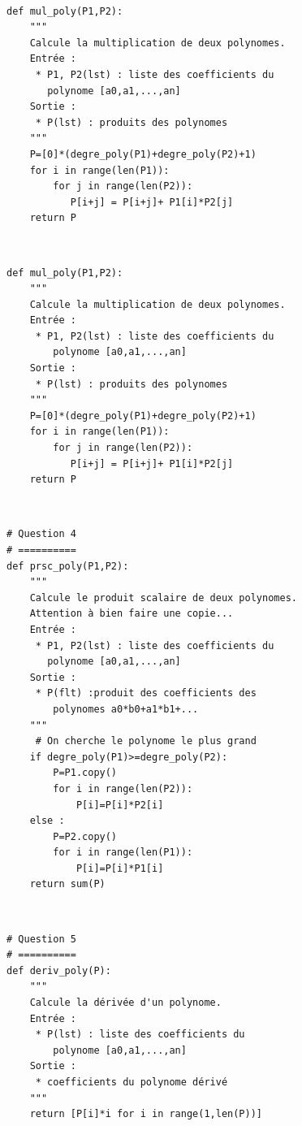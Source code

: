 \documentclass[10pt,fleqn]{article} %
\begin{document}
\begin{corrige}
$\quad$
\begin{lstlisting}
def mul_poly(P1,P2):
    """
    Calcule la multiplication de deux polynomes.
    Entrée : 
     * P1, P2(lst) : liste des coefficients du 
       polynome [a0,a1,...,an]
    Sortie : 
     * P(lst) : produits des polynomes
    """
    P=[0]*(degre_poly(P1)+degre_poly(P2)+1)
    for i in range(len(P1)):
        for j in range(len(P2)):
           P[i+j] = P[i+j]+ P1[i]*P2[j]
    return P
\end{lstlisting}
\end{corrige}

\begin{corrige}
$\quad$
\begin{lstlisting}
def mul_poly(P1,P2):
    """
    Calcule la multiplication de deux polynomes.
    Entrée : 
     * P1, P2(lst) : liste des coefficients du 
        polynome [a0,a1,...,an]
    Sortie : 
     * P(lst) : produits des polynomes
    """
    P=[0]*(degre_poly(P1)+degre_poly(P2)+1)
    for i in range(len(P1)):
        for j in range(len(P2)):
           P[i+j] = P[i+j]+ P1[i]*P2[j]
    return P
\end{lstlisting}
\end{corrige}



\begin{corrige}
$\quad$
\begin{lstlisting}
# Question 4
# ==========
def prsc_poly(P1,P2):
    """
    Calcule le produit scalaire de deux polynomes.
    Attention à bien faire une copie...
    Entrée : 
     * P1, P2(lst) : liste des coefficients du 
       polynome [a0,a1,...,an]
    Sortie : 
     * P(flt) :produit des coefficients des 
        polynomes a0*b0+a1*b1+...
    """
     # On cherche le polynome le plus grand
    if degre_poly(P1)>=degre_poly(P2):
        P=P1.copy()
        for i in range(len(P2)):
            P[i]=P[i]*P2[i]
    else :
        P=P2.copy()
        for i in range(len(P1)):
            P[i]=P[i]*P1[i]
    return sum(P)
\end{lstlisting}
\end{corrige}

\begin{corrige}
$\quad$
\begin{lstlisting}
# Question 5
# ==========
def deriv_poly(P):
    """
    Calcule la dérivée d'un polynome.
    Entrée : 
     * P(lst) : liste des coefficients du 
        polynome [a0,a1,...,an]
    Sortie : 
     * coefficients du polynome dérivé
    """
    return [P[i]*i for i in range(1,len(P))]
\end{lstlisting}
\end{corrige}
\end{document}
